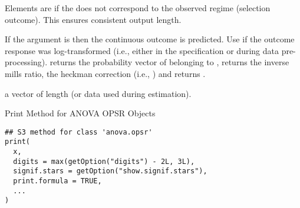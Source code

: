 \documentclass[letterpaper]{book}
\begin{document}
%
\begin{Details}
Elements are  if the  does not correspond to the observed
regime (selection outcome). This ensures consistent output length.

If the  argument is  then the continuous outcome is predicted.
Use  if the outcome response was log-transformed (i.e., either
in the  specification or during data pre-processing).
 returns the probability vector of belonging to , 
returns the inverse mills ratio,  the heckman correction (i.e.,
) and  returns .
\end{Details}
%
\begin{Value}
a vector of length  (or data used during estimation).
\end{Value}
%
\begin{SeeAlso}
\end{SeeAlso}
%
\begin{Examples}
\end{Examples}
%
\begin{Description}
Print Method for ANOVA OPSR Objects
\end{Description}
%
\begin{Usage}
\begin{verbatim}
## S3 method for class 'anova.opsr'
print(
  x,
  digits = max(getOption("digits") - 2L, 3L),
  signif.stars = getOption("show.signif.stars"),
  print.formula = TRUE,
  ...
)
\end{verbatim}
\end{Usage}
%
\end{document}
